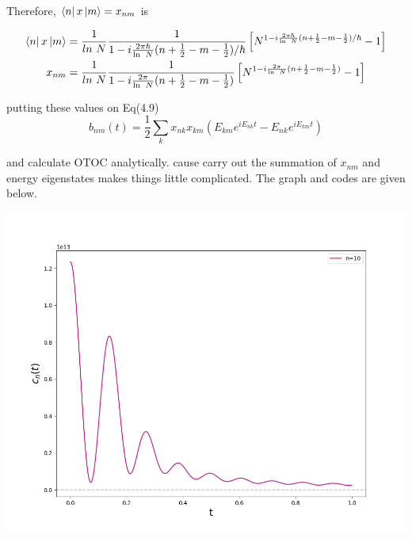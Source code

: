 \documentclass[12pt]{report}
\newcommand*{\1}{\hspace{1pt}}
\begin{document}
        Therefore, $\bra{n}x\ket{m}=x_{nm}$ is

        \begin{align}
            \bra{n}x\ket{m} &= \frac{1}{ln \ N} \frac{1}{1-i\frac{2\pi \hbar}{\ln \ N}(n + \frac{1}{2}-m-\frac{1}{2})/\hbar}\left[N^{1-i\frac{2\pi \hbar}{\ln \ N}(n + \frac{1}{2}-m-\frac{1}{2})/\hbar} - 1\right] \\
            x_{nm}&= \frac{1}{ln \ N} \frac{1}{1-i\frac{2\pi}{\ln \ N}(n + \frac{1}{2}-m-\frac{1}{2})}\left[N^{1-i\frac{2\pi}{\ln \ N}(n + \frac{1}{2}-m-\frac{1}{2})} - 1\right]
        \end{align}

        putting these values on Eq(4.9)
        \begin{equation*}
            b_{nm}(t) = \frac{1}{2}\sum_{k} x_{nk}x_{km}(E_{km}e^{i E _{nk}t} - E_{nk}e^{iE_{km}t}) 
        \end{equation*}

        and calculate OTOC analytically. cause carry out the summation of $x_{nm}$ and energy eigenstates makes things little complicated. The graph and codes are given below.

        \begin{adjustbox}{center,caption={},label={microcanocnial OTOC},nofloat=figure,}
            \includegraphics[width=\textwidth]{pic1}
        \end{adjustbox}
\end{document}

